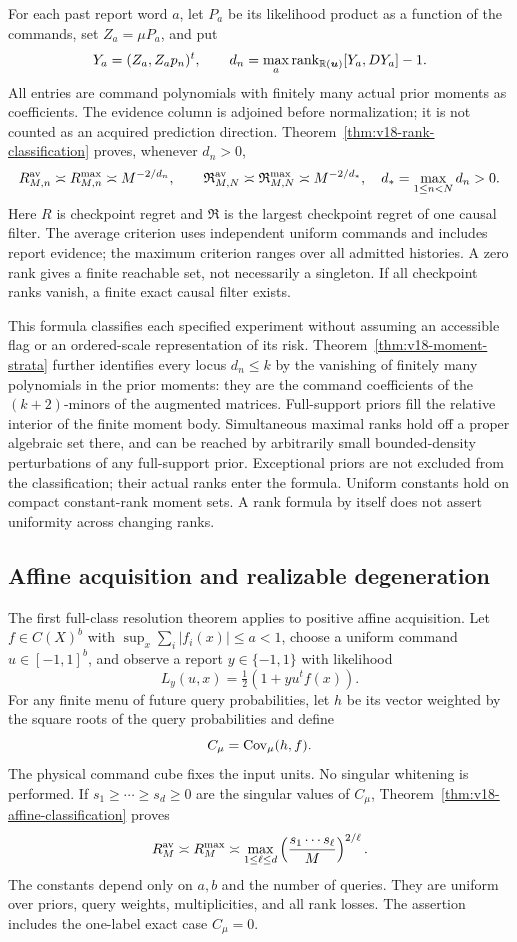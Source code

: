 For each past report word $a$, let $P_a$ be its likelihood product as a
function of the commands, set $Z_a=\mu P_a$, and put
\[
 Y_a=(Z_a,Z_ap_n)^t,\qquad
 d_n=\max_a\operatorname{rank}_{\mathbb R(\boldsymbol u)}[Y_a,DY_a]-1.
\]
All entries are command polynomials with finitely many actual prior
moments as coefficients. The evidence column is adjoined before
normalization; it is not counted as an acquired prediction direction.
Theorem~\ref{thm:v18-rank-classification} proves, whenever $d_n>0$,
\[
 R^{\rm av}_{M,n}\asymp R^{\rm max}_{M,n}\asymp M^{-2/d_n},
 \qquad
 \mathfrak R^{\rm av}_{M,N}\asymp
 \mathfrak R^{\rm max}_{M,N}\asymp M^{-2/d_*},
 \quad d_* =\max_{1\le n<N}d_n>0.
\]
Here $R$ is checkpoint regret and $\mathfrak R$ is the largest
checkpoint regret of one causal filter. The average criterion uses
independent uniform commands and includes report evidence; the maximum
criterion ranges over all admitted histories. A zero rank gives a
finite reachable set, not necessarily a singleton. If all checkpoint
ranks vanish, a finite exact causal filter exists.

This formula classifies each specified experiment without assuming an
accessible flag or an ordered-scale representation of its risk.
Theorem~\ref{thm:v18-moment-strata} further identifies every locus
$d_n\le k$ by the vanishing of finitely many polynomials in the prior
moments: they are the command coefficients of the $(k+2)$-minors of the
augmented matrices. Full-support priors fill the relative interior of the finite
moment body. Simultaneous maximal ranks hold off a proper algebraic
set there, and can be reached by arbitrarily small bounded-density
perturbations of any full-support prior. Exceptional priors are not
excluded from the classification; their actual ranks enter the formula.
Uniform constants hold on compact constant-rank moment sets. A rank
formula by itself does not assert uniformity across changing ranks.

\subsection{Affine acquisition and realizable degeneration}

The first full-class resolution theorem applies to positive affine
acquisition. Let $f\in C(X)^b$ with
$\sup_x\sum_i|f_i(x)|\le a<1$, choose a uniform command
$u\in[-1,1]^b$, and observe a report $y\in\{-1,1\}$ with likelihood
\[
 L_y(u,x)=\tfrac12(1+y u^tf(x)).
\]
For any finite menu of future query probabilities, let $h$ be its vector
weighted by the square roots of the query probabilities and define
\[
 C_\mu=\operatorname{Cov}_\mu(h,f).
\]
The physical command cube fixes the input units. No singular whitening
is performed. If $s_1\ge\cdots\ge s_d\ge0$ are the singular values
of $C_\mu$, Theorem~\ref{thm:v18-affine-classification} proves
\[
 R_M^{\rm av}\asymp R_M^{\rm max}\asymp
 \max_{1\le\ell\le d}
      \left(\frac{s_1\cdots s_\ell}{M}\right)^{2/\ell}.
\]
The constants depend only on $a,b$ and the number of queries. They are
uniform over priors, query weights, multiplicities, and all rank losses.
The assertion includes the one-label exact case $C_\mu=0$.

